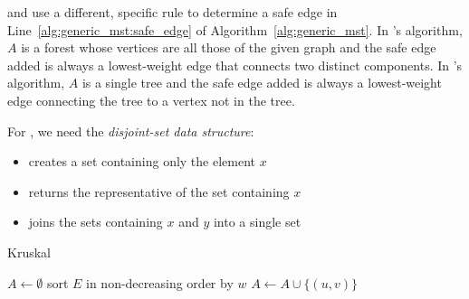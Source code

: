  and  use a different, specific rule to determine a safe edge in Line~\ref{alg:generic_mst:safe_edge} of Algorithm~\ref{alg:generic_mst}.
In 's algorithm, \(A\) is a forest whose vertices are all those of the given graph and the safe edge added is always a lowest-weight edge that connects two distinct components.
In 's algorithm, \(A\) is a single tree and the safe edge added is always a lowest-weight edge connecting the tree to a vertex not in the tree.

For , we need the \emph{disjoint-set data structure}:
\begin{itemize}
  \item {} creates a set containing only the element \(x\)
  \item {} returns the representative of the set containing \(x\)
  \item {} joins the sets containing \(x\) and \(y\) into a single set
\end{itemize}

\begin{algorithm}[h]
\caption{Kruskal}\label{alg:kruskal}
\begin{algorithmic}[1]
  \State $A\gets\emptyset$
  \State {}
  \EndFor
  \State sort $E$ in non-decreasing order by $w$
      \State $A\gets A\cup\{(u,v)\}$
      \State {}
    \EndIf
  \EndFor
\EndFunction
\end{algorithmic}
\end{algorithm}






